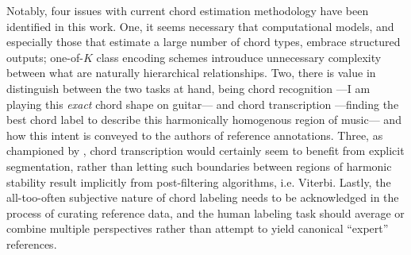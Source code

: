 \documentclass{article}
\begin{document}
Notably, four issues with current chord estimation methodology have been identified in this work.
One, it seems necessary that computational models, and especially those that estimate a large number of chord types, embrace structured outputs;
one-of-$K$ class encoding schemes introuduce unnecessary complexity between what are naturally hierarchical relationships.
Two, there is value in distinguish between the two tasks at hand, being chord recognition ---I am playing this \emph{exact} chord shape on guitar--- and chord transcription ---finding the best chord label to describe this harmonically homogenous region of music--- and how this intent is conveyed to the authors of reference annotations.
Three, as championed by \cite{Mauch}, chord transcription would certainly seem to benefit from explicit segmentation, rather than letting such boundaries between regions of harmonic stability result implicitly from post-filtering algorithms, i.e. Viterbi.
Lastly, the all-too-often subjective nature of chord labeling needs to be acknowledged in the process of curating reference data, and the human labeling task should average or combine multiple perspectives rather than attempt to yield canonical ``expert'' references.






%
%
%
%
\end{document}
